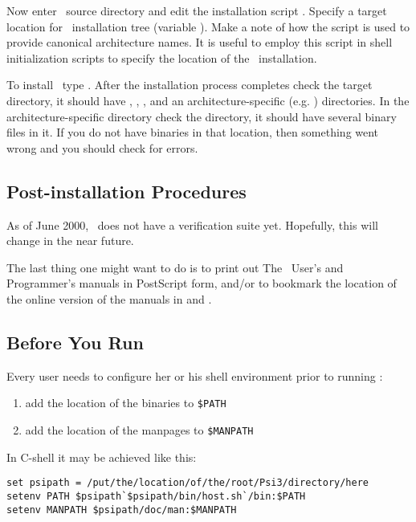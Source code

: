 Now enter \PSIthree\ source directory and edit the installation script
. Specify a target location for \PSIthree\ installation tree
(variable ). Make a note of how the  script
is used to provide canonical architecture names. It is useful to employ
this script in shell initialization scripts to specify the location of
the \PSIthree\ installation.

To install \PSIthree\ type . After the installation
process completes check the target directory, it should have
, , ,  and an
architecture-specific (e.g. )
directories. In the architecture-specific directory
check the  directory, it should have several
binary files in it. If you do not have binaries in that location,
then something went wrong and 
you should check  for errors.

\subsection{Post-installation Procedures}
As of June 2000, \PSIthree\ does not have a verification
suite yet. Hopefully, this will change in the near future.

The last thing one might want to do is to print out The \PSIthree\
User's and Programmer's manuals in PostScript form, and/or
to bookmark the location of the online version of the manuals
in  and
.

\subsection{Before You Run \PSIthree}
Every user needs to configure her or his
shell environment prior to running \PSIthree:
\begin{enumerate}
\item add the location of the binaries to {\tt \$PATH}
\item add the location of the manpages to {\tt \$MANPATH}
\end{enumerate}
In C-shell it may be achieved like this:
\begin{verbatim}
set psipath = /put/the/location/of/the/root/Psi3/directory/here
setenv PATH $psipath`$psipath/bin/host.sh`/bin:$PATH
setenv MANPATH $psipath/doc/man:$MANPATH
\end{verbatim}
